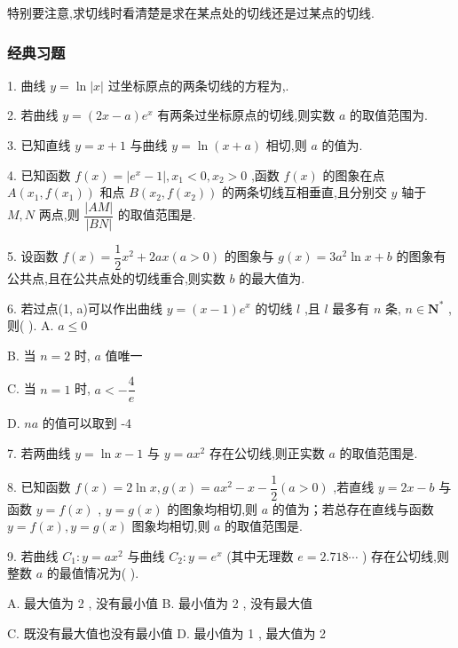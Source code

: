 特别要注意,求切线时看清楚是求在某点处的切线还是过某点的切线.

\subsubsection*{经典习题}

1. 曲线 $y = \ln \left| x\right|$ 过坐标原点的两条切线的方程为\blkda{},\blkda{}.

2. 若曲线 $y = \left( {{2x} - a}\right) {{e}}^{x}$ 有两条过坐标原点的切线,则实数 $a$ 的取值范围为\blkda{}.

3. 已知直线 $y = x + 1$ 与曲线 $y = \ln \left( {x + a}\right)$ 相切,则 $a$ 的值为\blkda{}.

4. 已知函数 $f\left( x\right)  = \left| {{{e}}^{x} - 1}\right| ,{x}_{1} < 0,{x}_{2} > 0$ ,函数 $f\left( x\right)$ 的图象在点 $A\left( {{x}_{1},f\left( {x}_{1}\right) }\right)$ 和点 $B\left( {{x}_{2},f\left( {x}_{2}\right) }\right)$ 的两条切线互相垂直,且分别交 $y$ 轴于 $M,N$ 两点,则 $\dfrac{\left| AM\right| }{\left| BN\right| }$ 的取值范围是\blkda{}.

5. 设函数 $f\left( x\right)  = \dfrac{1}{2}{x}^{2} + {2ax}\left( {a > 0}\right)$ 的图象与 $g\left( x\right)  = 3{a}^{2}\ln x + b$ 的图象有公共点,且在公共点处的切线重合,则实数 $b$ 的最大值为\blkda{}.

6. 若过点(1, a)可以作出曲线 $y = \left( {x - 1}\right) {{e}}^{x}$ 的切线 $l$ ,且 $l$ 最多有 $n$ 条, $n \in  {\mathbf{N}}^{ * }$ ,则(   ). A. $a \leq  0$

B. 当 $n = 2$ 时, $a$ 值唯一

C. 当 $n = 1$ 时, $a <  - \dfrac{4}{{e}}$

D. ${na}$ 的值可以取到 -4

7. 若两曲线 $y = \ln x - 1$ 与 $y = a{x}^{2}$ 存在公切线,则正实数 $a$ 的取值范围是\blkda{}.

8. 已知函数 $f\left( x\right)  = 2\ln x,g\left( x\right)  = a{x}^{2} - x - \dfrac{1}{2}\left( {a > 0}\right)$ ,若直线 $y = {2x} - b$ 与函数 $y = f\left( x\right)$ , $y = g\left( x\right)$ 的图象均相切,则 $a$ 的值为\blkda{}；若总存在直线与函数 $y = f\left( x\right) ,y = g\left( x\right)$ 图象均相切,则 $a$ 的取值范围是\blkda{}.

9. 若曲线 ${C}_{1} : y = a{x}^{2}$ 与曲线 ${C}_{2} : y = {{e}}^{x}$ (其中无理数 ${e} = {2.718}\cdots$ ) 存在公切线,则整数 $a$ 的最值情况为(   ).

A. 最大值为 2 , 没有最小值 B. 最小值为 2 , 没有最大值

C. 既没有最大值也没有最小值 D. 最小值为 1 , 最大值为 2

